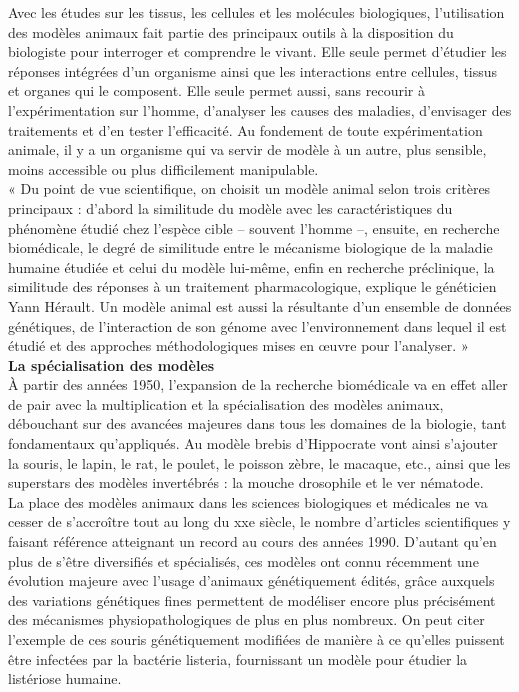 \documentclass[10pt]{article}
\begin{document}
Avec les études sur les tissus, les cellules et les molécules biologiques, l’utilisation des modèles animaux fait partie des principaux outils à la disposition du biologiste pour interroger et comprendre le vivant. Elle seule permet d’étudier les réponses intégrées d’un organisme ainsi que les interactions entre cellules, tissus et organes qui le composent. Elle seule permet aussi, sans recourir à l’expérimentation sur l’homme, d’analyser les causes des maladies, d’envisager des traitements et d’en tester l’efficacité. Au fondement de toute expérimentation animale, il y a un organisme qui va servir de modèle à un autre, plus sensible, moins accessible ou plus difficilement manipulable.\\

 « Du point de vue scientifique, on choisit un modèle animal selon trois critères principaux : d’abord la similitude du modèle avec les caractéristiques du phénomène étudié chez l’espèce cible – souvent l’homme –, ensuite, en recherche biomédicale, le degré de similitude entre le mécanisme biologique de la maladie humaine étudiée et celui du modèle lui-même, enfin en recherche préclinique, la similitude des réponses à un traitement pharmacologique, explique le généticien Yann Hérault. Un modèle animal est aussi la résultante d’un ensemble de données génétiques, de l’interaction de son génome avec l’environnement dans lequel il est étudié et des approches méthodologiques mises en œuvre pour l’analyser. »\\
 
\textbf{ La spécialisation des modèles}\\
 
 À partir des années 1950, l’expansion de la recherche biomédicale va en effet aller de pair avec la multiplication et la spécialisation des modèles animaux, débouchant sur des avancées majeures dans tous les domaines de la biologie, tant fondamentaux qu’appliqués. Au modèle brebis d’Hippocrate vont ainsi s’ajouter la souris, le lapin, le rat, le poulet, le poisson zèbre, le macaque, etc., ainsi que les superstars des modèles invertébrés : la mouche drosophile et le ver nématode.\\
 
 La place des modèles animaux dans les sciences biologiques et médicales ne va cesser de s’accroître tout au long du xxe siècle, le nombre d’articles scientifiques y faisant référence atteignant un record au cours des années 1990. D’autant qu’en plus de s’être diversifiés et spécialisés, ces modèles ont connu récemment une évolution majeure avec l’usage d’animaux génétiquement édités, grâce auxquels des variations génétiques fines permettent de modéliser encore plus précisément des mécanismes physiopathologiques de plus en plus nombreux. On peut citer l’exemple de ces souris génétiquement modifiées de manière à ce qu’elles puissent être infectées par la bactérie listeria, fournissant un modèle pour étudier la listériose humaine.\\
 
\end{document}
